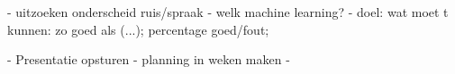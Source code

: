 -   uitzoeken onderscheid ruis/spraak
-   welk machine learning?
-   doel: wat moet t kunnen: zo goed als (...); percentage goed/fout;


-   Presentatie opsturen
-   planning in weken maken
-   
